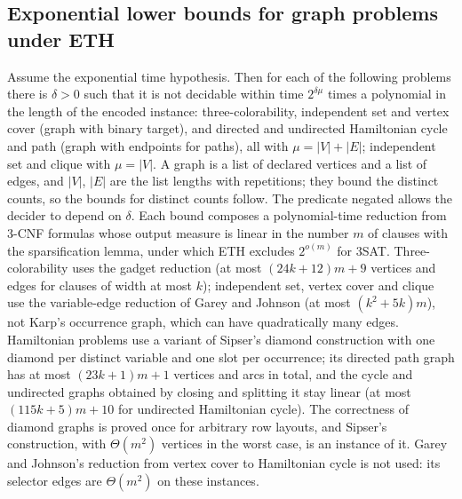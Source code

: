 \begin{result}
\subsection{Exponential lower bounds for graph problems under ETH}
Assume the exponential time hypothesis. Then for each of the following problems there is
$\delta>0$ such that it is not decidable within time $2^{\delta\mu}$ times a polynomial in the
length of the encoded instance: three-colorability, independent set and vertex cover (graph with
binary target), and directed and undirected Hamiltonian cycle and path (graph with endpoints for
paths), all with $\mu=|V|+|E|$; independent set and clique with $\mu=|V|$. A graph is a list of
declared vertices and a list of edges, and $|V|$, $|E|$ are the list lengths with repetitions;
they bound the distinct counts, so the bounds for distinct counts follow. The predicate negated
allows the decider to depend on $\delta$. Each bound composes a polynomial-time reduction from
3-CNF formulas whose output measure is linear in the number $m$ of clauses with the
sparsification lemma, under which ETH excludes $2^{o(m)}$ for 3SAT. Three-colorability uses the
gadget reduction (at most $(24k+12)m+9$ vertices and edges for clauses of width at most $k$);
independent set, vertex cover and clique use the variable-edge reduction of Garey and Johnson
(at most $(k^2+5k)m$), not Karp's occurrence graph, which can have quadratically many edges.
Hamiltonian problems use a variant of Sipser's diamond construction with one diamond per
distinct variable and one slot per occurrence; its directed path graph has at most $(23k+1)m+1$
vertices and arcs in total, and the cycle and undirected graphs obtained by closing and splitting
it stay linear (at most $(115k+5)m+10$ for undirected Hamiltonian cycle). The correctness of
diamond graphs is proved once for arbitrary row layouts, and Sipser's construction, with
$\Theta(m^2)$ vertices in the worst case, is an instance of it. Garey and Johnson's reduction from
vertex cover to Hamiltonian cycle is not used: its selector edges are $\Theta(m^2)$ on these
instances.
\citep{ImpagliazzoPaturiZane2001,CyganEtAl2015,LokshtanovMarxSaurabh2011,GareyJohnson1979,Sipser2013}

\end{result}
